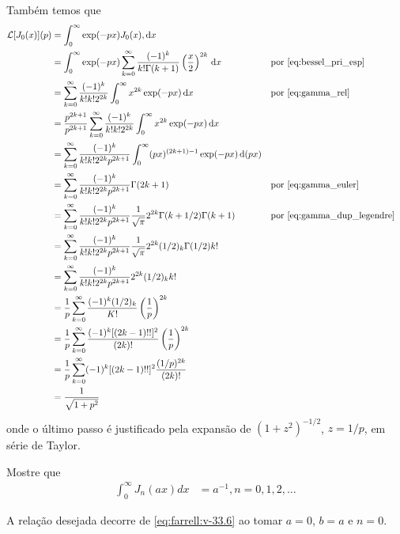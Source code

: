 \documentclass[a4paper,12pt, leqno, answers]{exam}
\begin{document}
\begin{questions}
\begin{solution}
        Tamb\'{e}m temos que
        \begin{align*}
            \mathcal{L}[J_0(x)](p) &= \int_0^\infty \exp(-p x) J_0(x) ,\mathrm{d}x \\
            &= \int_0^\infty \exp(-p x) \sum_{k = 0}^\infty \frac{(-1)^k}{k! \Gamma(k + 1)} \left( \frac{x}{2} \right)^{2k} \,\mathrm{d}x && \text{por \eqref{eq:bessel_pri_esp}} \\
            &= \sum_{k = 0}^\infty \frac{(-1)^k}{k! k! 2^{2k}} \int_0^\infty x^{2k} \exp(-p x) \,\mathrm{d}x && \text{por \eqref{eq:gamma_rel}} \\
            &= \frac{p^{2k + 1}}{p^{2k + 1}} \sum_{k = 0}^\infty \frac{(-1)^k}{k! k! 2^{2k}} \int_0^\infty x^{2k} \exp(-p x) \,\mathrm{d}x \\
            &= \sum_{k = 0}^\infty \frac{(-1)^k}{k! k! 2^{2k} p^{2k + 1}} \int_0^\infty (px)^{(2k + 1) - 1} \exp(-p x) \,\mathrm{d}(px) \\
            &= \sum_{k = 0}^\infty \frac{(-1)^k}{k! k! 2^{2k} p^{2k + 1}} \Gamma(2 k + 1) && \text{por \eqref{eq:gamma_euler}} \\
            &= \sum_{k = 0}^\infty \frac{(-1)^k}{k! k! 2^{2k} p^{2k + 1}} \frac{1}{\sqrt{\pi}} 2^{2k} \Gamma(k + 1/2) \Gamma(k + 1) && \text{por \eqref{eq:gamma_dup_legendre}} \\
            &= \sum_{k = 0}^\infty \frac{(-1)^k}{k! k! 2^{2k} p^{2k + 1}} \frac{1}{\sqrt{\pi}} 2^{2k} (1/2)_k \Gamma(1/2) k! \\
            &= \sum_{k = 0}^\infty \frac{(-1)^k}{k! k! 2^{2k} p^{2k + 1}} 2^{2k} (1/2)_k k! \\
            &= \frac{1}{p} \sum_{k = 0}^\infty \frac{(-1)^k (1/2)_k}{K!} \left( \frac{1}{p} \right)^{2k} \\
            &= \frac{1}{p} \sum_{k = 0}^\infty \frac{(-1)^k [(2k - 1)!!]^2}{(2k)!} \left( \frac{1}{p} \right)^{2k} \\
            &= \frac{1}{p} \sum_{k = 0}^\infty (-1)^k [(2k - 1)!!]^2 \frac{(1/p)^{2k}}{(2k)!} \\
            &= \frac{1}{\sqrt{1 + p^2}}
        \end{align*}
        onde o \'{u}ltimo passo \'{e} justificado pela expans\~{a}o de $(1 + z^2)^{-1/2}$, $z = 1/p$, em s\'{e}rie de Taylor.
    \end{solution}

    \question Mostre que
    \begin{align*}
        \int_0^\infty J_n(ax) dx &= a^{-1}, n = 0, 1, 2, \ldots
    \end{align*}
    \begin{solution}
        A rela\c{c}\~{a}o desejada decorre de \eqref{eq:farrell:v-33.6} ao tomar $a = 0$, $b = a$ e $n = 0$.


\end{solution}
\end{questions}
\end{document}
